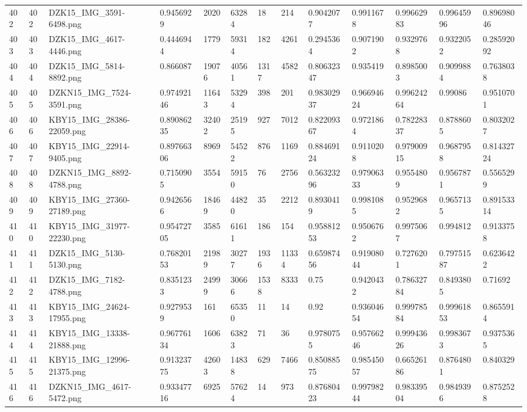 \documentclass[11pt, a4paper, twoside]{report}
\begin{document}
\begin{longtable}[c]{@{}lllllllllllll@{}}
402 & 402 & DZK15\_IMG\_3591-6498.png & 0.9456929 & 2020 & 63284 & 18 & 214 & 0.9042077 & 0.9911678 & 0.99662983 & 0.99645996 & 0.89698046 \\
403 & 403 & DZK15\_IMG\_4617-4446.png & 0.4446944 & 1779 & 59314 & 182 & 4261 & 0.2945364 & 0.9071902 & 0.9329768 & 0.9322052 & 0.28592092 \\
404 & 404 & DZK15\_IMG\_5814-8892.png & 0.866087 & 19076 & 40561 & 1317 & 4582 & 0.80632347 & 0.935419 & 0.8985003 & 0.9099884 & 0.7638038 \\
405 & 405 & DZKN15\_IMG\_7524-3591.png & 0.97492146 & 11643 & 53294 & 398 & 201 & 0.98302937 & 0.96694624 & 0.99624264 & 0.99086 & 0.9510701 \\
406 & 406 & KBY15\_IMG\_28386-22059.png & 0.89086235 & 32402 & 25195 & 927 & 7012 & 0.82209367 & 0.9721864 & 0.78228337 & 0.8788605 & 0.8032027 \\
407 & 407 & KBY15\_IMG\_22914-9405.png & 0.89766306 & 8969 & 54522 & 876 & 1169 & 0.88469124 & 0.9110208 & 0.97900915 & 0.9687958 & 0.81432724 \\
408 & 408 & DZKN15\_IMG\_8892-4788.png & 0.7150905 & 3554 & 59150 & 76 & 2756 & 0.56323296 & 0.97906333 & 0.9554809 & 0.9567871 & 0.5565299 \\
409 & 409 & KBY15\_IMG\_27360-27189.png & 0.9426566 & 18469 & 44820 & 35 & 2212 & 0.8930419 & 0.9981085 & 0.9529682 & 0.9657135 & 0.89153314 \\
410 & 410 & KBY15\_IMG\_31977-22230.png & 0.95472705 & 3585 & 61611 & 186 & 154 & 0.95881253 & 0.9506762 & 0.9975067 & 0.994812 & 0.9133758 \\
411 & 411 & DZK15\_IMG\_5130-5130.png & 0.76820153 & 21989 & 30277 & 1936 & 11334 & 0.65987456 & 0.91908044 & 0.7276201 & 0.79751587 & 0.6236422 \\
412 & 412 & DZK15\_IMG\_7182-4788.png & 0.8351233 & 24999 & 30666 & 1538 & 8333 & 0.75 & 0.9420432 & 0.78632784 & 0.8493805 & 0.71692 \\
413 & 413 & KBY15\_IMG\_24624-17955.png & 0.9279539 & 161 & 65350 & 11 & 14 & 0.92 & 0.93604654 & 0.99978584 & 0.99961853 & 0.8655914 \\
414 & 414 & KBY15\_IMG\_13338-21888.png & 0.96776134 & 1606 & 63823 & 71 & 36 & 0.9780755 & 0.95766246 & 0.99943626 & 0.9983673 & 0.9375365 \\
415 & 415 & KBY15\_IMG\_12996-21375.png & 0.91323775 & 42603 & 14838 & 629 & 7466 & 0.85088575 & 0.98545057 & 0.66526186 & 0.8764801 & 0.840329 \\
416 & 416 & DZKN15\_IMG\_4617-5472.png & 0.93347716 & 6925 & 57624 & 14 & 973 & 0.87680423 & 0.99798244 & 0.98339504 & 0.9849396 & 0.8752528 \\

\end{longtable}
\end{document}
